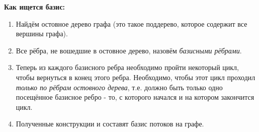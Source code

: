 \textbf{Как ищется базис:}
\begin{enumerate}
    \item Найдём остовное дерево графа (это такое поддерево, которое содержит все вершины графа).
    \item Все рёбра, не вошедшие в остовное дерево, назовём \textit{базисными рёбрами}.
    \item Теперь из каждого базисного ребра необходимо пройти некоторый цикл, чтобы вернуться в конец этого ребра.
    Необходимо, чтобы этот цикл проходил \textit{только по рёбрам остовного дерева}, т.е. должно быть только одно 
    посещённое базисное ребро - то, с которого начался и на котором закончится цикл.
    \item Полученные конструкции и составят базис потоков на графе.
\end{enumerate}

